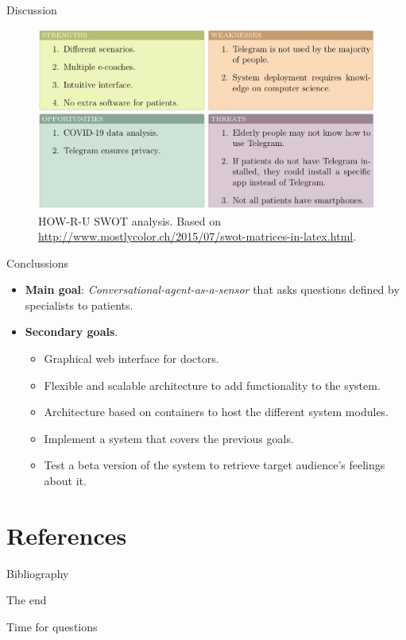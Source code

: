 \documentclass{beamer}
\newcommand{\greentick}{\textcolor{green}{\ding{52}}}
\newcommand{\redcross}{\textcolor{red}{\ding{55}}}
\begin{document}
\begin{frame}[fragile]{Discussion}
  \begin{figure}[H]
    \centering
    \includegraphics[width=\textwidth]{swot.png}
    \caption{HOW-R-U SWOT analysis. Based on \href{http://www.mostlycolor.ch/2015/07/swot-matrices-in-latex.html}{http://www.mostlycolor.ch/2015/07/swot-matrices-in-latex.html}.}
  \end{figure}
\end{frame}

\begin{frame}[fragile]{Conclussions}
  \begin{itemize}[<+->]
    \item \textbf{Main goal}: \emph{Conversational-agent-as-a-sensor} that asks questions defined by specialists to patients. \uncover<2-8>{\greentick}
    \item \textbf{Secondary goals}.
      \begin{itemize}[<+->]
        \item Graphical web interface for doctors. \uncover<4-8>{\greentick}
        \item Flexible and scalable architecture to add functionality to the system. \uncover<5-8>{\greentick}
        \item Architecture based on containers to host the different system modules. \uncover<6-8>{\greentick}
        \item Implement a system that covers the previous goals. \uncover<7-8>{\greentick}
        \item Test a beta version of the system to retrieve target audience’s feelings about it. \uncover<8>{\redcross}
      \end{itemize}
  \end{itemize}
\end{frame}

\section*{References}

\begin{frame}[allowframebreaks]{Bibliography}


\end{frame}

\begin{frame}{The end}
\begin{center}
  \Huge
  Time for questions
\end{center}
\end{frame}
\end{document}
